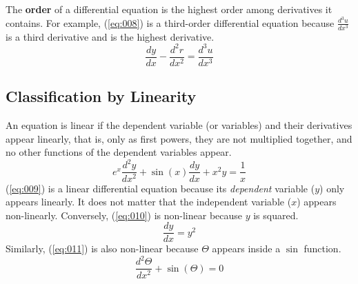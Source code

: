 \documentclass[12pt]{article}
\begin{document}
The \textbf{order} of a differential equation is the highest order among derivatives it contains. For example, (\ref{eq:008}) is a third-order differential equation because $\frac{d^3u}{dx^3}$ is a third derivative and is the highest derivative.
\begin{equation}
  \frac{dy}{dx} - \frac{d^2r}{dx^2} = \frac{d^3u}{dx^3}
  \label{eq:008}
\end{equation}

\subsection{Classification by Linearity}
\label{ssec:classificationByLinearity}

An equation is linear if the dependent variable (or variables) and their derivatives appear linearly, that is, only as first powers, they are not multiplied together, and no other functions of the dependent variables appear.
\begin{equation}
  e^x \frac{d^2y}{dx^2} + \sin(x) \frac{dy}{dx} + x^2y = \frac{1}{x}
  \label{eq:009}
\end{equation}
(\ref{eq:009}) is a linear differential equation because its \textit{dependent} variable ($y$) only appears linearly. It does not matter that the independent variable ($x$) appears non-linearly. Conversely, (\ref{eq:010}) is non-linear because $y$ is squared.
\begin{equation}
  \frac{dy}{dx} = y^2
  \label{eq:010}
\end{equation}
Similarly, (\ref{eq:011}) is also non-linear because $\Theta$ appears inside a $\sin$ function.
\begin{equation}
  \frac{d^2\Theta}{dx^2} + \sin(\Theta) = 0
  \label{eq:011}
\end{equation}
\end{document}
